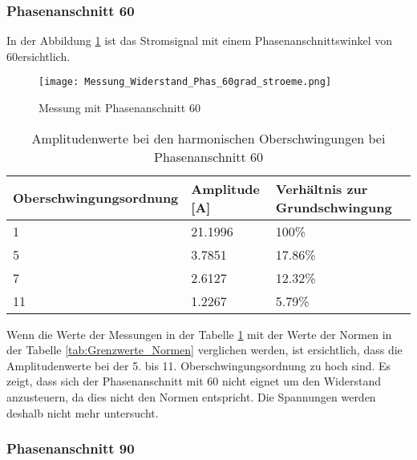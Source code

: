 \subsubsection*{Phasenanschnitt 60\textdegree}

In der Abbildung \ref{fig:Mess_Widerstand_Phas_60grad_stroeme} ist das Stromsignal mit einem Phasenanschnittswinkel von 60\textdegree ersichtlich. 

\begin{figure}[ht!]
	\centering
	\texttt{[image: Messung\_Widerstand\_Phas\_60grad\_stroeme.png]}	
	\caption{Messung mit Phasenanschnitt 60\textdegree}\label{fig:Mess_Widerstand_Phas_60grad_stroeme}
\end{figure}


\begin{table}[ht!]
	\centering
	\begin{tabular}{|l|l|l|}
		\hline
		Oberschwingungsordnung & Amplitude [A] 	& Verhältnis zur Grundschwingung	\\ \hline
		1                      & 21.1996   		& 100\%								\\ \hline
		5                      & 3.7851    		& 17.86\%							\\ \hline
		7                      & 2.6127    		& 12.32\%							\\ \hline
		11                     & 1.2267    		& 5.79\%							\\ \hline
	\end{tabular}
	\caption{Amplitudenwerte bei den harmonischen Oberschwingungen bei Phasenanschnitt 60\textdegree}\label{tab:Phas_60_Stroeme}
\end{table}

Wenn die Werte der Messungen in der Tabelle \ref{tab:Phas_60_Stroeme} mit der Werte der Normen in der Tabelle \ref{tab:Grenzwerte_Normen} verglichen werden, ist ersichtlich, dass die Amplitudenwerte bei der 5. bis 11. Oberschwingungsordnung zu hoch sind. Es zeigt, dass sich der Phasenanschnitt mit 60\textdegree \hspace{0.02cm} nicht eignet um den Widerstand anzusteuern, da dies nicht den Normen entspricht. Die Spannungen werden deshalb nicht mehr untersucht. 


\subsubsection*{Phasenanschnitt 90\textdegree}


